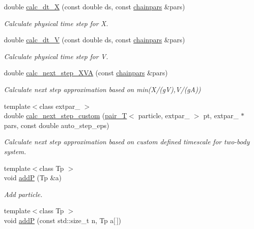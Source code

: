 \begin{DoxyCompactItemize}
double \hyperlink{classARC_1_1chain_afe66b8b83172bbe5c3d4375e76ce135f}{calc\+\_\+dt\+\_\+X} (const double ds, const \hyperlink{classARC_1_1chainpars}{chainpars} \&pars)
\begin{DoxyCompactList}\small\item\em Calculate physical time step for X. \end{DoxyCompactList}\item 
double \hyperlink{classARC_1_1chain_a000772c395f316bbda100e58e1dc7db4}{calc\+\_\+dt\+\_\+V} (const double ds, const \hyperlink{classARC_1_1chainpars}{chainpars} \&pars)
\begin{DoxyCompactList}\small\item\em Calculate physical time step for V. \end{DoxyCompactList}\item 
double \hyperlink{classARC_1_1chain_ae09a8f3826db280d8bdcf9d40085bf3a}{calc\+\_\+next\+\_\+step\+\_\+\+X\+VA} (const \hyperlink{classARC_1_1chainpars}{chainpars} \&pars)
\begin{DoxyCompactList}\small\item\em Calculate next step approximation based on min(X/(gV),V/(gA)) \end{DoxyCompactList}\item 
{\footnotesize template$<$class extpar\+\_\+ $>$ }\\double \hyperlink{classARC_1_1chain_a39cf4c21491c5e23b34d8bd6fe99b091}{calc\+\_\+next\+\_\+step\+\_\+custom} (\hyperlink{namespaceARC_af6dbf77cf2968752315f7712eb2515a3}{pair\+\_\+T}$<$ particle, extpar\+\_\+ $>$ pt, extpar\+\_\+ $\ast$pars, const double auto\+\_\+step\+\_\+eps)
\begin{DoxyCompactList}\small\item\em Calculate next step approximation based on custom defined timescale for two-\/body system. \end{DoxyCompactList}\item 
{\footnotesize template$<$class Tp $>$ }\\void \hyperlink{classARC_1_1chain_a2df655cb46fcb7e892f196340e7d5c83}{addP} (Tp \&a)
\begin{DoxyCompactList}\small\item\em Add particle. \end{DoxyCompactList}\item 
{\footnotesize template$<$class Tp $>$ }\\void \hyperlink{classARC_1_1chain_aa89210cc0dd376c75e6acc30d2db740e}{addP} (const std\+::size\+\_\+t n, Tp a\mbox{[}$\,$\mbox{]})

\end{DoxyCompactItemize}
